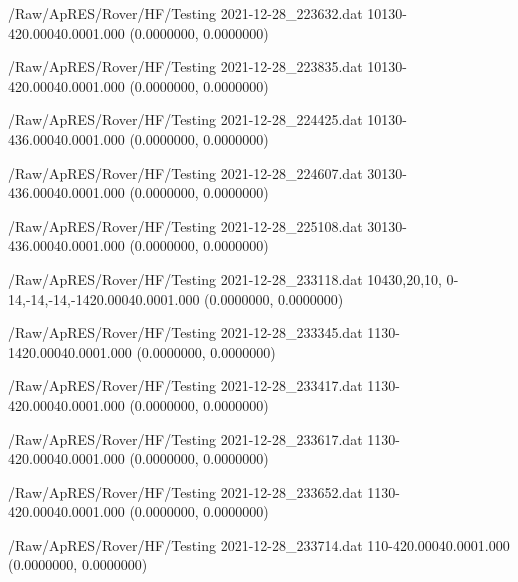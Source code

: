 \hfaprestable
{/Raw/ApRES/Rover/HF/Testing}%
{2021-12-28\_223632.dat}%
{10}{1}{30}{-4}{20.000}{40.000}{1.000}%
{ (0.0000000, 0.0000000)}%
{}%
{}%

\hfaprestable
{/Raw/ApRES/Rover/HF/Testing}%
{2021-12-28\_223835.dat}%
{10}{1}{30}{-4}{20.000}{40.000}{1.000}%
{ (0.0000000, 0.0000000)}%
{}%
{}%

\hfaprestable
{/Raw/ApRES/Rover/HF/Testing}%
{2021-12-28\_224425.dat}%
{10}{1}{30}{-4}{36.000}{40.000}{1.000}%
{ (0.0000000, 0.0000000)}%
{}%
{}%

\hfaprestable
{/Raw/ApRES/Rover/HF/Testing}%
{2021-12-28\_224607.dat}%
{30}{1}{30}{-4}{36.000}{40.000}{1.000}%
{ (0.0000000, 0.0000000)}%
{}%
{}%

\hfaprestable
{/Raw/ApRES/Rover/HF/Testing}%
{2021-12-28\_225108.dat}%
{30}{1}{30}{-4}{36.000}{40.000}{1.000}%
{ (0.0000000, 0.0000000)}%
{}%
{}%

\hfaprestable
{/Raw/ApRES/Rover/HF/Testing}%
{2021-12-28\_233118.dat}%
{10}{4}{30,20,10, 0}{-14,-14,-14,-14}{20.000}{40.000}{1.000}%
{ (0.0000000, 0.0000000)}%
{}%
{}%

\hfaprestable
{/Raw/ApRES/Rover/HF/Testing}%
{2021-12-28\_233345.dat}%
{1}{1}{30}{-14}{20.000}{40.000}{1.000}%
{ (0.0000000, 0.0000000)}%
{}%
{}%

\hfaprestable
{/Raw/ApRES/Rover/HF/Testing}%
{2021-12-28\_233417.dat}%
{1}{1}{30}{-4}{20.000}{40.000}{1.000}%
{ (0.0000000, 0.0000000)}%
{}%
{}%

\hfaprestable
{/Raw/ApRES/Rover/HF/Testing}%
{2021-12-28\_233617.dat}%
{1}{1}{30}{-4}{20.000}{40.000}{1.000}%
{ (0.0000000, 0.0000000)}%
{}%
{}%

\hfaprestable
{/Raw/ApRES/Rover/HF/Testing}%
{2021-12-28\_233652.dat}%
{1}{1}{30}{-4}{20.000}{40.000}{1.000}%
{ (0.0000000, 0.0000000)}%
{}%
{}%

\hfaprestable
{/Raw/ApRES/Rover/HF/Testing}%
{2021-12-28\_233714.dat}%
{1}{1}{0}{-4}{20.000}{40.000}{1.000}%
{ (0.0000000, 0.0000000)}%
{}%
{}%

